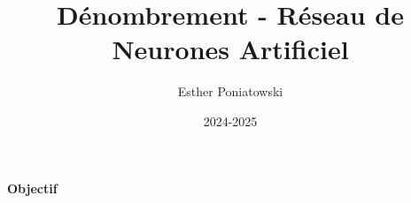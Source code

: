 \documentclass[10pt,a4paper]{article}
\title{Dénombrement - Réseau de Neurones Artificiel}
\author{Esther Poniatowski}
\date{2024-2025}
\begin{document}
\textbf{Objectif}
\end{document}
